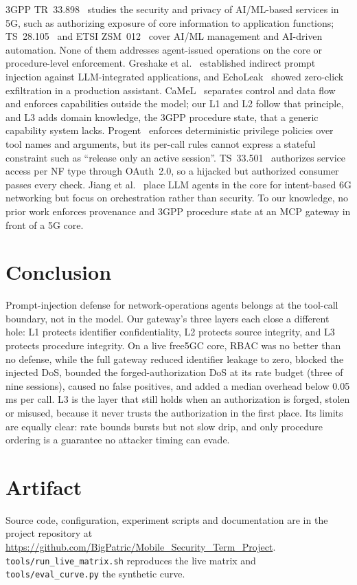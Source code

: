 \documentclass[conference]{IEEEtran}
\newcommand{\code}[1]{\texttt{\small #1}}
\begin{document}
3GPP TR~33.898~\cite{tr33898} studies the security and privacy of AI/ML-based services in 5G,
such as authorizing exposure of core information to application functions; TS~28.105~\cite{ts28105}
and ETSI ZSM~012~\cite{zsm012} cover AI/ML management and AI-driven automation. None of them
addresses agent-issued operations on the core or procedure-level enforcement. Greshake
et al.~\cite{greshake2023} established indirect prompt injection against LLM-integrated
applications, and EchoLeak~\cite{echoleak2025} showed zero-click exfiltration in a production
assistant. CaMeL~\cite{camel2025} separates control and data flow and enforces capabilities
outside the model; our L1 and L2 follow that principle, and L3 adds domain knowledge, the
3GPP procedure state, that a generic capability system lacks. Progent~\cite{progent2025}
enforces deterministic privilege policies over tool names and arguments, but its per-call
rules cannot express a stateful constraint such as ``release only an active session''.
TS~33.501~\cite{ts33501} authorizes service access per NF type through OAuth~2.0, so a
hijacked but authorized consumer passes every check. Jiang et
al.~\cite{jiang2026} place LLM agents in the core for intent-based 6G networking but focus on
orchestration rather than security. To our knowledge, no prior work enforces provenance and
3GPP procedure state at an MCP gateway in front of a 5G core.

\section{Conclusion}

Prompt-injection defense for network-operations agents belongs at the tool-call boundary,
not in the model. Our gateway's three layers each close a different hole: L1 protects
identifier confidentiality, L2 protects source integrity, and L3 protects procedure
integrity. On a live free5GC core, RBAC was no better than no defense, while the full gateway
reduced identifier leakage to zero, blocked the injected DoS, bounded the forged-authorization
DoS at its rate budget (three of nine sessions), caused no false positives, and added a median
overhead below 0.05\,ms per call.
L3 is the layer that still holds when an authorization is forged, stolen or misused,
because it never trusts the authorization in the first place. Its limits are equally
clear: rate bounds bursts but not slow drip, and only procedure ordering is a guarantee no
attacker timing can evade.

\section*{Artifact}
{\raggedright
Source code, configuration, experiment scripts and documentation are in the project
repository at
\url{https://github.com/BigPatric/Mobile_Security_Term_Project}.
\code{tools/run\_live\_matrix.sh} reproduces the live matrix and
\code{tools/eval\_curve.py} the synthetic curve.\par}



\end{document}
